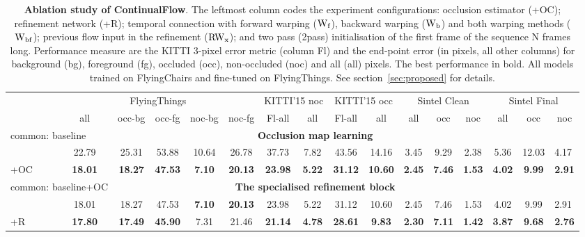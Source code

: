 \documentclass[runningheads]{llncs}
\begin{document}
\begin{table}[]
\caption{\textbf{Ablation study of ContinualFlow}.
The leftmost column codes the experiment configurations: occlusion estimator (+OC); refinement network (+R); temporal connection with forward warping ($\rm W_f$), backward warping ($\rm W_b$) and both warping methods ($\rm {W}_{bf}$); previous flow input in the refinement ($\rm RW_{x}$); and two pass (2pass) initialisation of the first frame of the sequence N frames long. Performance measure are the KITTI 3-pixel error metric (column Fl) and the end-point error (in pixels, all other columns) for background (bg), foreground (fg), occluded (occ), non-occluded (noc) and all (all) pixels.
The best performance in bold.
All models trained on FlyingChairs and fine-tuned on FlyingThings.
See section~\ref{sec:proposed} for details.\\}
\label{tab:ablation_study}
\centering
\begin{adjustbox}{max width=\textwidth}
\begin{tabular}{l|ccccc|cc|cc|ccc|ccc}
\textbf{} & \multicolumn{5}{c|}{FlyingThings} & \multicolumn{2}{c|}{KITTI'15 noc} & \multicolumn{2}{c|}{KITTI'15 occ} & \multicolumn{3}{c|}{Sintel Clean} & \multicolumn{3}{c}{Sintel Final} \\
 & all & occ-bg & occ-fg & noc-bg & noc-fg & Fl-all & all & Fl-all & all & all & occ & noc & all & occ & noc  \\ \hline
\multicolumn{2}{|l}{common: baseline} & \multicolumn{12}{c}{\textbf{Occlusion map learning}} & \multicolumn{2}{l|}{} \\ \hline
\multicolumn{1}{|l|}{} & 22.79 & 25.31 & 53.88 & 10.64 & 26.78 & 37.73 & 7.82 & 43.56 & 14.16 & 3.45 & 9.29 & 2.38 & 5.36 & 12.03 & \multicolumn{1}{|l|}{4.17} \\
\multicolumn{1}{|l|}{+OC} & \textbf{18.01} & \textbf{18.27} & \textbf{47.53} & \textbf{7.10} & \textbf{20.13} & \textbf{23.98} & \textbf{5.22} & \textbf{31.12} & \textbf{10.60} & \textbf{2.45} & \textbf{7.46} & \textbf{1.53} & \textbf{4.02} & \textbf{9.99} & \multicolumn{1}{|l|}{\textbf{2.91}} \\ \hline \hline
\multicolumn{2}{|l}{common: baseline+OC} & \multicolumn{12}{c}{\textbf{The specialised refinement block}} & \multicolumn{2}{l|}{} \\ \hline
\multicolumn{1}{|l|}{} & 18.01 & 18.27 & 47.53 & \textbf{7.10} & \textbf{20.13} & 23.98 & 5.22 & 31.12 & 10.60 & 2.45 & 7.46 & 1.53 & 4.02 & 9.99 & \multicolumn{1}{|l|}{2.91} \\
\multicolumn{1}{|l|}{+R} & \textbf{17.80} & \textbf{17.49} & \textbf{45.90} & 7.31 & 21.46 & \textbf{21.14} & \textbf{4.78} & \textbf{28.61} & \textbf{9.83} & \textbf{2.30} & \textbf{7.11} & \textbf{1.42} & \textbf{3.87} & \textbf{9.68} & \multicolumn{1}{|l|}{\textbf{2.76}} \\ \hline \hline

\end{tabular}
\end{adjustbox}
\end{table}
\end{document}
